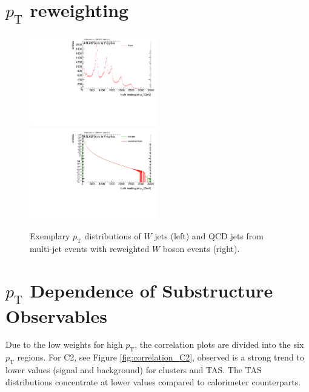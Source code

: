 
\section{$p_{\text{T}}$ reweighting}
\begin{figure} 
	\includegraphics[width=0.5\textwidth]{sascha_input/plots/track_selection/h_leadpt_truth.pdf} \hspace{1mm}
	\includegraphics[width=0.5\textwidth]{sascha_input/plots/track_selection/h_leadpt_truth_weight.pdf}
\caption{{Exemplary $p_{\mathrm{T}}$ distributions of $W$ jets (left) and QCD jets from multi-jet events with reweighted $W$ boson events (right).}}\label{fig:p_T}
\end{figure}

\section{$p_{\text{T}}$ Dependence of Substructure Observables}\label{appendix:pt_dependence}
Due to the low weights for high $p_{\mathrm{T}}$, the correlation plots are divided into the six $p_{\mathrm{T}}$ regions. For C2, see Figure \ref{fig:correlation_C2}, observed is a strong trend to lower values (signal and background) for clusters and TAS. The TAS distributions concentrate at lower values compared to calorimeter counterparts.

